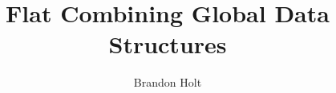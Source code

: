 
\usepackage{microtype}


\title{\Large Flat Combining Global Data Structures}


\author{Brandon Holt}


\maketitle
\begin{abstract}

\end{abstract}












